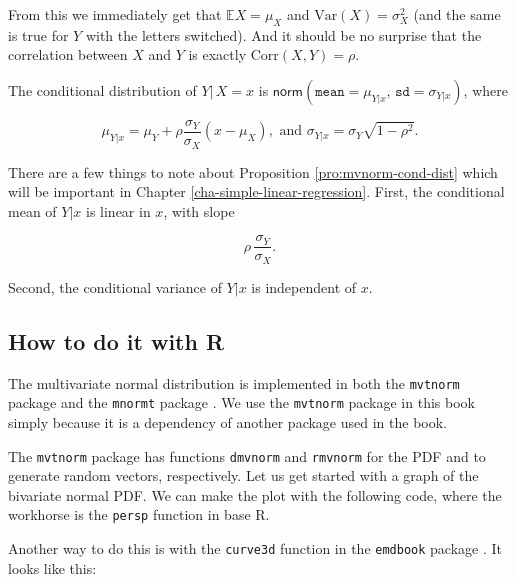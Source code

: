 \documentclass[]{book}
\numberwithin{equation}{chapter}
\numberwithin{figure}{chapter}
\theoremstyle{plain}
\theoremstyle{definition}
\theoremstyle{remark}
\theoremstyle{definition}
\theoremstyle{definition}
\theoremstyle{remark}
\let\BeginKnitrBlock\begin \let\EndKnitrBlock\end
\begin{document}
From this we immediately get that \(\mathbb{E} X=\mu_{X}\) and
\(\mbox{Var}(X)=\sigma_{X}^{2}\) (and the same is true for \(Y\) with
the letters switched). And it should be no surprise that the correlation
between \(X\) and \(Y\) is exactly \(\mbox{Corr}(X,Y)=\rho\).

\bigskip

\BeginKnitrBlock{proposition}
\protect\hypertarget{prp:mvnorm-cond-dist}{}{\label{prp:mvnorm-cond-dist}}The
conditional distribution of \(Y|\, X=x\) is
\(\mathsf{norm}(\mathtt{mean} = \mu_{Y|x}, \, \mathtt{sd} = \sigma_{Y|x})\),
where

\begin{equation}
\mu_{Y|x}=\mu_{Y}+\rho\frac{\sigma_{Y}}{\sigma_{X}}\left(x-\mu_{X}\right),\mbox{ and }\sigma_{Y|x}=\sigma_{Y}\sqrt{1-\rho^{2}}.
\end{equation}
\EndKnitrBlock{proposition}

There are a few things to note about Proposition
\ref{pro:mvnorm-cond-dist} which will be important in Chapter
\ref{cha-simple-linear-regression}. First, the conditional mean of
\(Y|x\) is linear in \(x\), with slope

\begin{equation}
\label{eq-population-slope-slr}
\rho\,\frac{\sigma_{Y}}{\sigma_{X}}.
\end{equation}

Second, the conditional variance of \(Y|x\) is independent of \(x\).

\subsection{How to do it with R}\label{how-to-do-it-with-r-22}

The multivariate normal distribution is implemented in both the
\texttt{mvtnorm} package \autocite{mvtnorm:1} and the \texttt{mnormt}
package \autocite{mnormt}. We use the \texttt{mvtnorm} package in this
book simply because it is a dependency of another package used in the
book.

The \texttt{mvtnorm} package has functions \texttt{dmvnorm} and
\texttt{rmvnorm} for the PDF and to generate random vectors,
respectively. Let us get started with a graph of the bivariate normal
PDF. We can make the plot with the following code, where the workhorse
is the \texttt{persp} function in base R.

Another way to do this is with the \texttt{curve3d} function in the
\texttt{emdbook} package \autocite{emdbook}. It looks like this:
\end{document}
